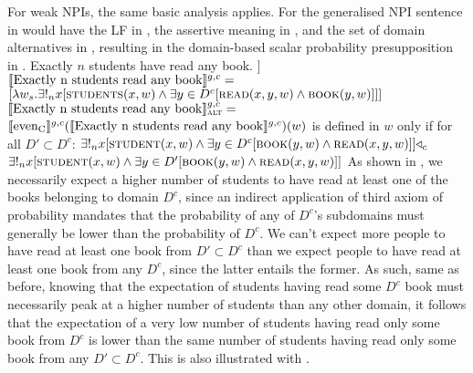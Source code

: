For weak NPIs, the same basic analysis applies. For the generalised NPI sentence in  would have the LF in , the assertive meaning in , and the set of domain alternatives in , resulting in the domain-based scalar probability presupposition in .
\pex
\a Exactly $n$ students have read any book.
\a[] [even\textsubscript{C} [exactly $n$ students read any book]]
\a $\intension[g,c]{Exactly n students read any book}=$\\\emptyfill$[\lambda{w_s}.\exists!_n{x}[\predicate{students}(x,w)\land\exists{y\in{D}^c}[\predicate{read}(x,y,w)\land\predicate{book}(y,w)]]]$
\a $\intension[g,c]{Exactly n students read any book}_{\text{\scshape alt}}=$\\\emptyfill{}
\xe
\ex
$\intension[g,c]{even\textsubscript{C}}(\intension[g,c]{Exactly n students read any book})(w)$ is defined in $w$ only if for all $D'\subset D^c$: $\exists!_n{x}[\predicate{student}(x,w)\land\exists{y\in{D^c}}[\predicate{book}(y,w)\land\predicate{read}(x,y,w)]]\lprob_c$\\\emptyfill$\exists!_n{x}[\predicate{student}(x,w)\land\exists{y\in{D'}}[\predicate{book}(y,w)\land\predicate{read}(x,y,w)]]$
\xe
As shown in , we necessarily expect a higher number of students to have read at least one of the books belonging to domain $D^c$, since an indirect application of  third axiom of probability mandates that the probability of any of $D^c$'s subdomains must generally be lower than the probability of $D^c$.  We can't expect more people to have read at least one book from $D'\subset D^c$ than we expect people to have read at least one book from any $D^c$, since the latter entails the former. As such, same as before, knowing that the expectation of students having read some $D^c$ book must necessarily peak at a higher number of students than any other domain, it follows that the expectation of a very low number of students having read only some book from $D^c$ is lower than the same number of students having read only some book from any $D'\subset D^c$. This is also illustrated with .

